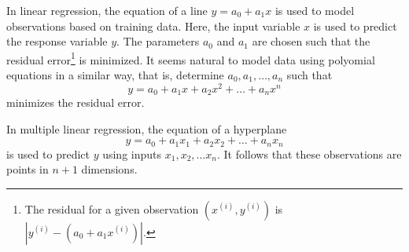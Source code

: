 
In linear regression, the equation of a line \(y = a_0 + a_1 x\) is used to model observations based on training data.
Here, the input variable \(x\) is used to predict the response variable \(y\).
The parameters \(a_0\) and \(a_1\) are chosen such that the residual error\footnote{The residual for a given observation \(\left(x^{(i)},y^{(i)}\right)\) is \(\left|y^{(i)} - \left(a_0 + a_1 x^{(i)}\right)\right|\).} is minimized.
It seems natural to model data using polyomial equations in a similar way, that is, determine \(a_0, a_1, \dots, a_n\) such that
\begin{equation}
    \label{eqn:polynomial-regression}
    y = a_0 + a_1 x + a_2 x^2 + \dots + a_n x^n
\end{equation}
minimizes the residual error.
%     

In multiple linear regression, the equation of a hyperplane
\begin{equation}
    \label{eqn:multiple-linear-regression}
    y = a_0 + a_1 x_1 + a_2 x_2 + \dots + a_n x_n
\end{equation}
is used to predict \(y\) using inputs \(x_1, x_2, \dots x_n\).
It follows that these observations are points in \(n + 1\) dimensions.


